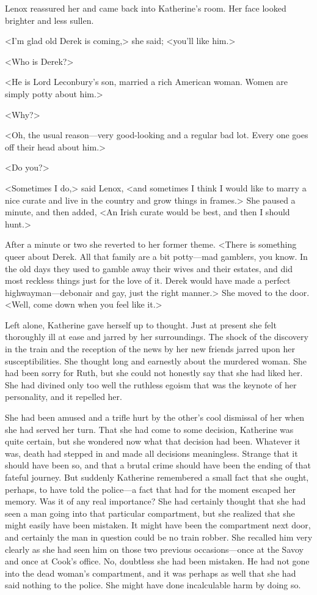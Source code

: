 Lenox reassured her and came back into Katherine's room. Her face looked brighter and less sullen.

<I'm glad old Derek is coming,> she said; <you'll like him.>

<Who is Derek?>

<He is Lord Leconbury's son, married a rich American woman. Women are simply potty about him.>

<Why?>

<Oh, the usual reason—very good-looking and a regular bad lot. Every one goes off their head about him.>

<Do you?>

<Sometimes I do,> said Lenox, <and sometimes I think I would like to marry a nice curate and live in the country and grow things in frames.> She paused a minute, and then added, <An Irish curate would be best, and then I should hunt.>

After a minute or two she reverted to her former theme. <There is something queer about Derek. All that family are a bit potty—mad gamblers, you know. In the old days they used to gamble away their wives and their estates, and did most reckless things just for the love of it. Derek would have made a perfect highwayman—debonair and gay, just the right manner.> She moved to the door. <Well, come down when you feel like it.>

Left alone, Katherine gave herself up to thought. Just at present she felt thoroughly ill at ease and jarred by her surroundings. The shock of the discovery in the train and the reception of the news by her new friends jarred upon her susceptibilities. She thought long and earnestly about the murdered woman. She had been sorry for Ruth, but she could not honestly say that she had liked her. She had divined only too well the ruthless egoism that was the keynote of her personality, and it repelled her.

She had been amused and a trifle hurt by the other's cool dismissal of her when she had served her turn. That she had come to some decision, Katherine was quite certain, but she wondered now what that decision had been. Whatever it was, death had stepped in and made all decisions meaningless. Strange that it should have been so, and that a brutal crime should have been the ending of that fateful journey. But suddenly Katherine remembered a small fact that she ought, perhaps, to have told the police—a fact that had for the moment escaped her memory. Was it of any real importance? She had certainly thought that she had seen a man going into that particular compartment, but she realized that she might easily have been mistaken. It might have been the compartment next door, and certainly the man in question could be no train robber. She recalled him very clearly as she had seen him on those two previous occasions—once at the Savoy and once at Cook's office. No, doubtless she had been mistaken. He had not gone into the dead woman's compartment, and it was perhaps as well that she had said nothing to the police. She might have done incalculable harm by doing so.

